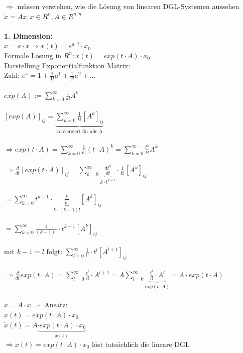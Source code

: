 $\Rightarrow$ müssen verstehen, wie die Lösung von linearen DGL-Systemen aussehen\\
$\dot{x}=Ax, x \in R^n, A \in R^{n,n}$\\\\
\textbf{1. Dimension:}\\
$\dot{x}=a \cdot x \Rightarrow x(t)=e^{a \cdot t} \cdot x_0$\\
Formale Lösung in $R^n: x(t)=exp(t \cdot A) \cdot x_0$\\
Darstellung Exponentialfunktion Matrix:\\
Zahl: $e^a=1+\frac{1}{1!}a^1 + \frac{1}{2!}a^2 + …$\\\\
$exp(A):= \displaystyle \sum_{k=0}^{\infty} \frac{1}{k!} A^k$\\\\
$[exp(A)]_{ij}= \underbrace{\sum_{k=0}^{\infty} \frac{1}{k!} [A^k]_{ij}}_{\text{konvergiert für alle A}}$\\\\
$\Rightarrow exp(t \cdot A) = \displaystyle  \sum_{k=0}^{\infty} \frac{1}{k!} (t \cdot A)^k =  \displaystyle \sum_{k=0}^{\infty} \frac{t^k}{k!} A^k$\\\\
$\Rightarrow \frac{d}{dt} [exp(t \cdot A)]_{ij}=\displaystyle \sum_{k=0}^{\infty} \underbrace{\frac{dt^k}{dt}}_{k \cdot t^{k-1}} \cdot \frac{1}{k!} [A^k]_{ij}$\\\\
$=\displaystyle \sum_{k=0}^{\infty} t^{k-1} \cdot \underbrace{\frac{k}{k!}}_{k \cdot (k-1)!} [A^k]_{ij}$\\\\
$=\displaystyle \sum_{k=0}^{\infty} \frac{1}{(k-1)!} \cdot t^{k-1} [A^k]_{ij}$\\\\
mit $k-1=l$ folgt: $\displaystyle \sum_{l=0}^{\infty} \frac{1}{l!} \cdot t^l [A^{l+1}]_{ij}$\\\\
$\Rightarrow \frac{d}{dt} exp(t \cdot A)=\displaystyle \sum_{l=0}^{\infty} \frac{t^l}{l!} \cdot A^{l+1} = A \displaystyle \sum_{l=0}^{\infty} \underbrace{\frac{t^l}{l!} \cdot A^l}_{exp(t \cdot A)}=A \cdot exp(t \cdot A)$\\\\

$\dot{x} = A \cdot x \Rightarrow$ Ansatz:\\
$x(t)=exp(t \cdot A) \cdot x_0$\\
$\dot{x}(t)=A \underbrace{\cdot exp(t \cdot A) \cdot x_0}_{x(t)}$\\
$\Rightarrow x(t)=exp(t \cdot A) \cdot x_0$ löst tatsächlich die lineare DGL\\\\


